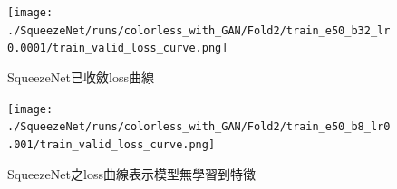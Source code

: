 \begin{abstract}
    \noindent\textbf{E. SqueezeNet}\\
    在SqueezeNet的模型訓練當中，觀察accurracy、loss曲線：
    \begin{enumerate}
        \item SqueezeNet在不論是有無使用GAN進行擴充的資料集下，loss曲線幾乎都有收斂\ref{fig:SqueezeNet_convergence_loss_curve}，除了在batch size為8與learning rate為1e-3，以本次實驗來說batch size極小learning rate極大的情況下，loss曲線完全沒有收斂\ref{fig:SqueezeNet_unconvergence_loss_curve}，甚至是模型完全沒有學習到特徵。
        \item 而在learning rate為1e-3的情況下，多數的loss曲線會在epoch為10左右出現較大的起伏\ref{fig:SqueezeNet_unconvergence_loss_curve_1e-3}，進而影響到後面的模型收斂與最後的準確率。
        \item 準確度上因為多數情況下loss曲線都有收斂，所以準確度普遍落在0.96左右\ref{fig:SqueezeNet_accuracy_curve_0.96}，在learning rate為1e-3，並且最後有收斂的情況下，準確率在0.69左右\ref{fig:SqueezeNet_accuracy_curve_0.69}。
        \item 針對有使用GAN的資料集，在loss曲線有收斂完成的情況下，準確率與無使用GAN的資料集無明顯差異。
    \end{enumerate}
    在SqueezeNet的模型訓練當中，觀察confusion matrix與其指標：
    \begin{enumerate}
        \item 對於同一個class，在loss曲線有收斂完成的情況下，precision與recall都達到0.96左右，而未完成收斂的情況則是precision與recall數據持平，表示模型並沒有完整學習到特徵。
        \item 以confusion matrix綜觀全部的classes，最差的表現通常落在open、good，又以open的情況又較差\ref{fig:SqueezeNet_confuson_matrix}。
    \end{enumerate}
\end{abstract}
\begin{figure}[!ht]
    \centering
    \texttt{[image: ./SqueezeNet/runs/colorless\_with\_GAN/Fold2/train\_e50\_b32\_lr0.0001/train\_valid\_loss\_curve.png]}
    \caption{SqueezeNet已收斂loss曲線}
    \label{fig:SqueezeNet_convergence_loss_curve}
\end{figure}
\begin{figure}[!ht]
    \centering
    \texttt{[image: ./SqueezeNet/runs/colorless\_with\_GAN/Fold2/train\_e50\_b8\_lr0.001/train\_valid\_loss\_curve.png]}
    \caption{SqueezeNet之loss曲線表示模型無學習到特徵}
    \label{fig:SqueezeNet_unconvergence_loss_curve}
\end{figure}
